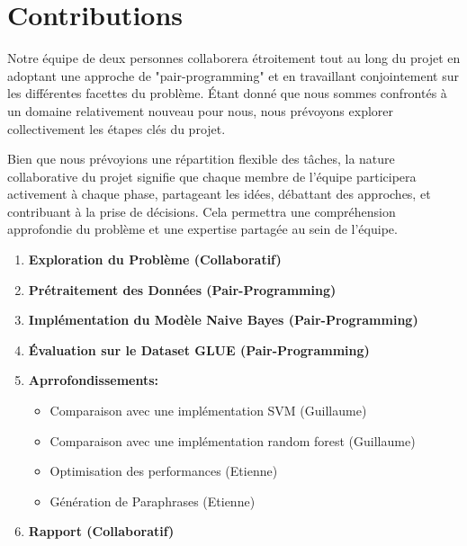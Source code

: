 \documentclass[12pt]{article}
\begin{document}
\pagebreak
\section{Contributions}
Notre équipe de deux personnes collaborera étroitement tout au long
du projet en adoptant une approche de "pair-programming" et en
travaillant conjointement sur les différentes facettes du problème.
Étant donné que nous sommes confrontés à un domaine relativement
nouveau pour nous, nous prévoyons explorer collectivement les étapes
clés du projet.

Bien que nous prévoyions une répartition flexible des tâches, la
nature collaborative du projet signifie que chaque membre de l'équipe
participera activement à chaque phase, partageant les idées,
débattant des approches, et contribuant à la prise de décisions.
Cela permettra une compréhension approfondie du problème et une
expertise partagée au sein de l'équipe.

\begin{enumerate}
	\item \textbf{Exploration du Problème (Collaboratif)}
	\item \textbf{Prétraitement des Données (Pair-Programming)}
	\item \textbf{Implémentation du Modèle Naive Bayes (Pair-Programming)}
	\item \textbf{Évaluation sur le Dataset GLUE (Pair-Programming)}
	\item \textbf{Aprrofondissements:}
	      \begin{itemize}
		      \item Comparaison avec une implémentation SVM (Guillaume)
		      \item Comparaison avec une implémentation random forest (Guillaume)
		      \item Optimisation des performances (Etienne)
		      \item Génération de Paraphrases (Etienne)
	      \end{itemize}
	\item \textbf{Rapport (Collaboratif)}
\end{enumerate}

\pagebreak{}\printbibliography[heading=bibintoc]
\end{document}
